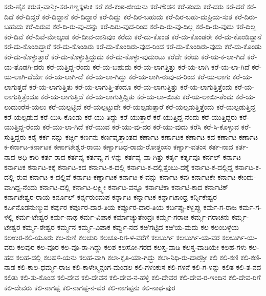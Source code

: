 ಕರು-ಣೈಕ
ಕರುತ್ತ-ವಾನ್ತೀ-ಸರ-ಗಣ್ಡಕ್ಕಳುಕಿ
ಕರೆ
ಕರೆ-ಕಂಠ-ಜೀಯನು
ಕರೆ-ಗೌಡನ
ಕರೆ-ತಂದು
ಕರೆ-ದರು
ಕರೆ-ದರೆ
ಕರೆ-ದಿದೆ
ಕರೆ-ದಿದ್ದರೆ
ಕರೆ-ದಿದ್ದಾನೆ
ಕರೆ-ದಿದ್ದಾರೆ
ಕರೆ-ದಿದ್ದು
ಕರೆ-ದಿರ-ಬಹುದು
ಕರೆ-ದಿರ-ಬಹು-ದುಪ್ರಿಯ-ಸುತ
ಕರೆ-ದಿರು-ಬಹುದು
ಕರೆ-ದಿರುವ
ಕರೆ-ದಿ-ರು-ವು-ದನ್ನು
ಕರೆ-ದಿರು-ವುದ-ರಿಂದ
ಕರೆ-ದಿ-ರು-ವು-ದಿಲ್ಲ
ಕರೆ-ದಿ-ರು-ವುದು
ಕರೆ-ದಿಲ್ಲ
ಕರೆ-ದಿವೆ
ಕರೆ-ದಿವೆ-ಮೇಲ್ಕಂಡ
ಕರೆ-ದೀವ-ದಾನಿವುಂ
ಕರೆದು
ಕರೆ-ದು-ಕೊಂಡ
ಕರೆ-ದು-ಕೊಂಡರೇ
ಕರೆ-ದು-ಕೊಂಡಿದ್ದಾನೆ
ಕರೆ-ದು-ಕೊಂಡಿದ್ದಾರೆ
ಕರೆ-ದು-ಕೊಂಡಿರು
ಕರೆ-ದು-ಕೊಂಡಿರು-ವುದ-ರಿಂದ
ಕರೆ-ದು-ಕೊಂಡಿರು-ವುದು
ಕರೆ-ದು-ಕೊಂಡು
ಕರೆ-ದು-ಕೊಳ್ಳುತ್ತಾರೆ
ಕರೆ-ದು-ಕೊಳ್ಳುತ್ತಿದ್ದುದು
ಕರೆ-ದು-ಕೊಳ್ಳು-ವುದುಂಟು
ಕರೆದೇ
ಕರೆಯ
ಕರೆ-ಯ-ಕ-ಲಾ-ಗಿದೆ
ಕರೆ-ಯ-ತೊಡಗಿ-ದರು
ಕರೆ-ಯತ್ತಿದ್ದ-ರೆಂದು
ಕರೆ-ಯ-ಬಹುದು
ಕರೆ-ಯ-ಲಾಗತ್ತಿತ್ತು
ಕರೆ-ಯ-ಲಾಗಿ
ಕರೆ-ಯ-ಲಾ-ಗಿದೆ
ಕರೆ-ಯ-ಲಾಗಿ-ದೆಯೇ
ಕರೆ-ಯ-ಲಾಗಿ-ದೆೆ
ಕರೆ-ಯ-ಲಾ-ಗಿದ್ದು
ಕರೆ-ಯ-ಲಾಗಿ-ರುವು-ದ-ರಿಂದ
ಕರೆ-ಯ-ಲಾಗು
ಕರೆ-ಯ-ಲಾಗುತ್ತದೆ
ಕರೆ-ಯ-ಲಾಗುತ್ತಿತು
ಕರೆ-ಯ-ಲಾಗುತ್ತಿ-ತೆಂದೂ
ಕರೆ-ಯ-ಲಾಗುತ್ತಿತ್ತು
ಕರೆ-ಯ-ಲಾಗುತ್ತಿತ್ತೆಂದು
ಕರೆ-ಯ-ಲಾಗುತ್ತಿತ್ತೆಂದೂ
ಕರೆ-ಯ-ಲಾಗುತ್ತಿದೆ
ಕರೆ-ಯ-ಲಾಗುತ್ತಿದ್ದಿತು
ಕರೆ-ಯ-ಲಾ-ಯಿತು
ಕರೆ-ಯ-ಲಾಯಿ-ತೆಂದು
ಕರೆ-ಯ-ಲುದುಂರೆಸೆ-ಯಲು
ಕರೆ-ಯಲ್ಪಟ್ಟಿದೆ
ಕರೆ-ಯಲ್ಪಟ್ಟುದೇ
ಕರೆ-ಯಲ್ಪಡುತ್ತಾರೆ
ಕರೆ-ಯಲ್ಪಡುತ್ತಿತ್ತೆಂದು
ಕರೆ-ಯಲ್ಪಡುತ್ತಿದ್ದ
ಕರೆ-ಯಲ್ಪಡುವ
ಕರೆ-ಯಿಸಿ-ಕೊಂಡು
ಕರೆ-ಯು-ತಿದ್ದು
ಕರೆ-ಯುತ್ತಾರೆ
ಕರೆ-ಯುತ್ತಿದ್ದ-ನೆಂದು
ಕರೆ-ಯುತ್ತಿದ್ದರು
ಕರೆ-ಯುತ್ತಿದ್ದ-ರೆಂದು
ಕರೆ-ಯು-ಲಾ-ಗಿದೆ
ಕರೆ-ಯುವ
ಕರೆ-ಯು-ವು-ದರ
ಕರೆ-ಯು-ವುದು
ಕರೆಸಿ
ಕರೆ-ಸಿ-ಕೊಳ್ಳುವ
ಕರೆ-ಸುತ್ತಿದ್ದರು
ಕರೈ
ಕರ್ಕ-ನನ್ನು
ಕರ್ಚ್ಚಿ
ಕರ್ಣನು
ಕರ್ಣವೃತ್ತಾಂತದ
ಕರ್ಣಾಟ
ಕರ್ಣಾಟಕ
ಕರ್ಣಾಟ-ಕದ
ಕರ್ಣಾಟ-ಕರ್ಣಾಟ-ಕ-ಕರ್ನಾಟ-ಕರ್ನಾಟಕ
ಕರ್ಣಾಟೇಶ್ವರ-ರಾಯ
ಕರ್ಣ್ನಾಟಧ-ರಾಮ-ರೋತ್ತಂಸಂ
ಕರ್ಣ್ನಾ-ವತಂಸ
ಕರ್ತ-ನಾದ
ಕರ್ತ-ನಾದ-ಅಧಿ-ಕಾರಿ
ಕರ್ತ-ರಾದ
ಕರ್ತವ್ಯ
ಕರ್ತವ್ಯ-ಗ-ಳನ್ನು
ಕರ್ತವ್ಯ-ವಾ-ಗಿತ್ತು
ಕರ್ತೃ
ಕರ್ತೃವೂ
ಕರ್ನಲ್
ಕರ್ನಾಟ
ಕರ್ನಾಟಕ
ಕರ್ನಾಟ-ಕಕ್ಕೆ
ಕರ್ನಾಟ-ಕದ
ಕರ್ನಾಟ-ಕ-ದಲ್ಲಿ
ಕರ್ನಾಟ-ಕ-ದಲ್ಲಿತ್ತೆಂಬು-ದಕ್ಕೆ
ಕರ್ನಾಟ-ಕ-ದಲ್ಲಿದ್ದ
ಕರ್ನಾಟ-ಕ-ದಲ್ಲಿ-ರುವ
ಕರ್ನಾಟ-ಕ-ದಲ್ಲಿವೆ
ಕರ್ನಾಟ-ಕರ್ಣ್ನಾಟಕ
ಕರ್ನಾಟ-ಕ-ವನ್ನು
ಕರ್ನಾಟ-ಕವು
ಕರ್ನಾಟಕೇ
ಕರ್ನಾಟ-ಕೇಂದು-ವಾಗಿದ್ದ-ನೆಂದು
ಕರ್ನಾಟ-ದಲ್ಲಿ
ಕರ್ನಾಟ-ಲಕ್ಷ್ಮೀ
ಕರ್ನಾಟ-ವನ್ನೂ
ಕರ್ನಾಟಿಕಾ
ಕರ್ನಾಟಿ-ಕಾದ
ಕರ್ನಾಟಿಕ್
ಕರ್ನಾಟೇಶ್ವರ-ರಾಯ
ಕರ್ನೂಲ್
ಕರ್ನ್ನರುಂಮಪ
ಕರ್ನ್ನಾಟ
ಕರ್ನ್ನಾಟಕ
ಕರ್ನ್ನಾಟಾಂಧ್ರ
ಕರ್ನ್ನಿಕೇಶ್ವರ
ಕರ್ಪಿನೊಡನುಣ್ಮುವ
ಕರ್ಪುರ
ಕರ್ಪೂರ-ದಾರ-ತಿಯ
ಕರ್ಪ್ಪೂರ-ದಾರ-ತಿಯ
ಕರ್ಬಪ್ಪು-ಕಳ್ಬಪ್ಪು
ಕರ್ಮ-ಗ-ರಾಜ
ಕರ್ಮ-ಗ-ಳಲ್ಲಿ
ಕರ್ಮ-ಟೇಶ್ವರ
ಕರ್ಮ-ನಾಥ
ಕರ್ಮ-ವಿಪಾಕ
ಕರ್ಮಾಚ್ಯುತೇಂದ್ರಃ
ಕರ್ಮ್ಮ-ಗರಾಚ
ಕರ್ಮ್ಮ-ಗರಾಚನು
ಕರ್ಮ್ಮ-ಟೇಶ್ವರ
ಕರ್ಮ್ಮ-ಠೇಶ್ವರ
ಕರ್ಮ್ಮನ
ಕರ್ಮ್ಮ-ವಿಪಾಕ
ಕರ್ವ್ವು-ನದ
ಕಱಿಗಟ್ಟಿದ
ಕಱಿಯ-ಮದು
ಕಲ
ಕಲಂಬಳ್ಳೆಯ
ಕಲಉರ-ಕಲಿ-ಯೂರು
ಕಲ-ಕುಣಿ
ಕಲಚುರಿ
ಕಲಚೂ-ರಿಗ-ಳ-ವರೆಗೆ
ಕಲಬುರ್ಗಿ
ಕಲಬುರ್ಗಿ-ಯ-ವರ
ಕಲಬುರ್ಗಿ-ಯ-ವರು
ಕಲವುರ
ಕಲ-ವೂರ
ಕಲ-ವೂ-ರಾ-ಗಿದ್ದು
ಕಲಶ
ಕಲಸೋ-ಗರದ
ಕಲಸ್ತ-ವಾಡಿ
ಕಲಸ್ತ-ವಾಡಿಯೇ
ಕಲಹ-ಗಳು
ಕಲ-ಹದ
ಕಲಹ-ದಲ್ಲಿ
ಕಲಹಳಿ-ಯನು
ಕಲಹ-ವಾಗಿ
ಕಲಾ-ಕೃತಿ-ಯಾ-ಗಿದ್ದು
ಕಲಾ-ನಿಧಿ-ರು-ದಾರಶ್ರೀ
ಕಲಿ
ಕಲಿ-ಕಣಿ
ಕಲಿ-ಕಣಿ-ನಾಡ
ಕಲಿ-ಕಾಲ-ಧರ್ಮ್ಮ-ರಾಜ
ಕಲಿ-ಕಾಳೇಸ್ಮಿನ್ಗಂಗ-ಮಂಡಲ
ಕಲಿ-ಗಳಂಕುಸ
ಕಲಿ-ಗಳನೆ
ಕಲಿ-ಗ-ಳನ್ನು
ಕಲಿತ
ಕಲಿ-ತ-ನದ
ಕಲಿತು
ಕಲಿ-ತು-ಕೊಂಡ
ಕಲಿ-ದೇವ
ಕಲಿ-ದೇವನ
ಕಲಿ-ದೇವ-ನ-ಹಳ್ಳಿ
ಕಲಿ-ದೇವರ
ಕಲಿ-ದೇವ-ರ-ಇಂದಿನ
ಕಲಿ-ದೇವ-ರಿಗೆ
ಕಲಿ-ದೇವರು
ಕಲಿ-ನಾಗಪ್ಪ
ಕಲಿ-ನಾಗಪ್ಪ-ನ-ವರ
ಕಲಿ-ನಾಗಪ್ಪನು
ಕಲಿ-ನಾಥ-ಪುರ
